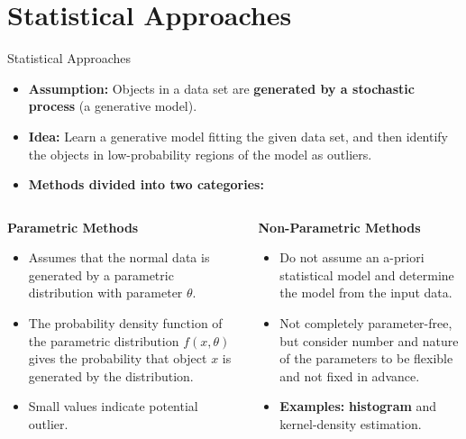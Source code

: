 \section{Statistical Approaches}


\begin{frame}{Statistical Approaches}
	\begin{itemize}
		\item \textbf{Assumption:} Objects in a data set are \textbf{\color{airforceblue}generated by a stochastic process} (a generative model).
		\item \textbf{Idea:} Learn a generative model fitting the given data set, and then identify the objects in low-probability regions of the model as outliers.
		\item \textbf{Methods divided into two categories:}
	\end{itemize}
	\vspace*{-2em}
	\begin{columns}
		\begin{column}{0.5\textwidth}
			\begin{center}
				\textbf{Parametric Methods}
			\end{center}
			\vspace*{-1.2em}
			\begin{itemize}
				\item Assumes that the normal data is generated by a parametric distribution with parameter $\theta$.
				\item The probability density function of the parametric distribution $f(x, \theta)$ gives the probability that object $x$ is generated by the distribution.
				\item Small values indicate potential outlier.
			\end{itemize}
		\end{column}
		\begin{column}{0.5\textwidth}
			\pause
			\begin{center}
				\textbf{Non-Parametric Methods}
			\end{center}
			\vspace*{-1.2em}
			\begin{itemize}
				\item Do not assume an a-priori statistical model and determine the model from the input data.
				\item Not completely parameter-free, but consider number and nature of the parameters to be flexible and not fixed in advance.
				\item \textbf{Examples:} \textbf{\color{airforceblue}histogram} and kernel-density estimation.
			\end{itemize}
		\end{column}
	\end{columns}
\end{frame}

